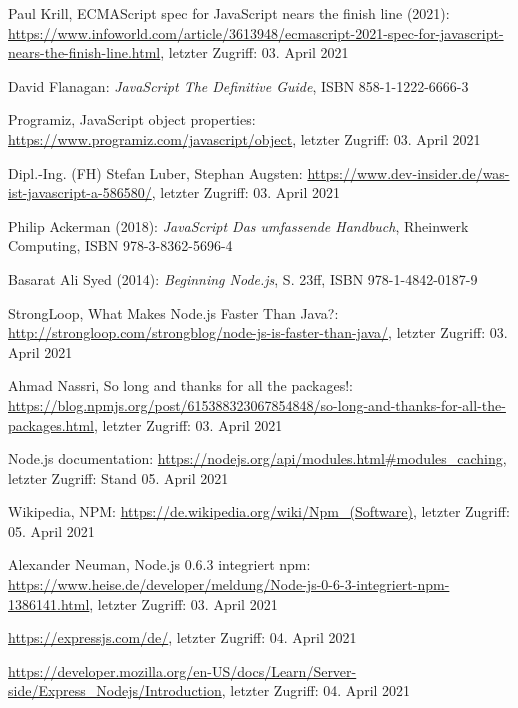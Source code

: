 \documentclass[11pt,a4paper]{article}
\begin{document}
\begin{itemize}
 Paul Krill, ECMAScript  spec for JavaScript nears the finish line (2021): \url{https://www.infoworld.com/article/3613948/ecmascript-2021-spec-for-javascript-nears-the-finish-line.html}, letzter Zugriff: 03. April 2021

 David Flanagan: \textit{JavaScript The Definitive Guide}, ISBN 858-1-1222-6666-3

 Programiz, JavaScript object properties: \url{https://www.programiz.com/javascript/object}, letzter Zugriff: 03. April 2021

 Dipl.-Ing. (FH) Stefan Luber, Stephan Augsten: \url{https://www.dev-insider.de/was-ist-javascript-a-586580/}, letzter Zugriff: 03. April 2021

 Philip Ackerman  (2018):  \textit{JavaScript Das umfassende Handbuch}, Rheinwerk Computing, ISBN 978-3-8362-5696-4

%
%
%
%



 Basarat Ali Syed (2014): \textit{Beginning Node.js}, S. 23ff, ISBN 978-1-4842-0187-9

 StrongLoop, What Makes Node.js Faster Than Java?: \url{http://strongloop.com/strongblog/node-js-is-faster-than-java/}, letzter Zugriff: 03. April 2021

 Ahmad Nassri, So long and thanks for all the packages!: \url{https://blog.npmjs.org/post/615388323067854848/so-long-and-thanks-for-all-the-packages.html}, letzter Zugriff: 03. April 2021

 Node.js documentation: \url{https://nodejs.org/api/modules.html#modules_caching}, letzter Zugriff: Stand 05. April 2021

 Wikipedia, NPM: \url{https://de.wikipedia.org/wiki/Npm_(Software)}, letzter Zugriff: 05. April 2021

 Alexander Neuman, Node.js 0.6.3 integriert npm:  \url{https://www.heise.de/developer/meldung/Node-js-0-6-3-integriert-npm-1386141.html}, letzter Zugriff: 03. April 2021

 \url{https://expressjs.com/de/}, letzter Zugriff: 04. April 2021

 \url{https://developer.mozilla.org/en-US/docs/Learn/Server-side/Express_Nodejs/Introduction}, letzter Zugriff: 04. April 2021


\end{itemize}
\end{document}
